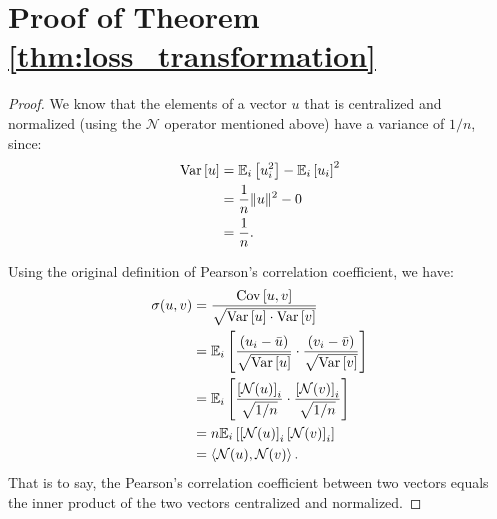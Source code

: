 \section{Proof of Theorem \ref{thm:loss_transformation}} \label{sec:thm_proof}

\begin{proof}
    
We know that the elements of a vector $u$ that is centralized and normalized (using the $\mathcal{N}$ operator mentioned above) have a variance of $1/n$, since:
\begin{equation}
    \begin{aligned}
        \mathrm{Var}\left[u\right]
        & = \mathbb{E}_{i}\left[u_i^2\right] - \mathbb{E}_{i}\left[u_i\right]^2 \\
        & = \frac{1}{n}\|u\|^2 - 0 \\
        & = \frac{1}{n}.
    \end{aligned}
\end{equation}

Using the original definition of Pearson's correlation coefficient, we have:
\begin{equation}
    \begin{aligned}
        \sigma(u, v)
        & = \frac{\mathrm{Cov}\left[u, v\right]}{\sqrt{\mathrm{Var}\left[u\right] \cdot \mathrm{Var}\left[v\right]}} \\
        & = \mathbb{E}_{i}\left[
            \frac{(u_i - \bar{u})}{\sqrt{\mathrm{Var}\left[u\right]}}
            \cdot
            \frac{(v_i - \bar{v})}{\sqrt{\mathrm{Var}\left[v\right]}}
        \right] \\
        & = \mathbb{E}_{i}\left[
            \frac{\left[\mathcal{N}(u)\right]_i}{\sqrt{1/n}}
            \cdot
            \frac{\left[\mathcal{N}(v)\right]_i}{\sqrt{1/n}}
        \right] \\
        & = n\mathbb{E}_{i}\left[\left[\mathcal{N}(u)\right]_i \left[\mathcal{N}(v)\right]_i\right] \\
        & = \left\langle \mathcal{N}(u), \mathcal{N}(v)\right\rangle.
    \end{aligned}
\end{equation}
That is to say, the Pearson's correlation coefficient between two vectors equals the inner product of the two vectors centralized and normalized.


\end{proof}
